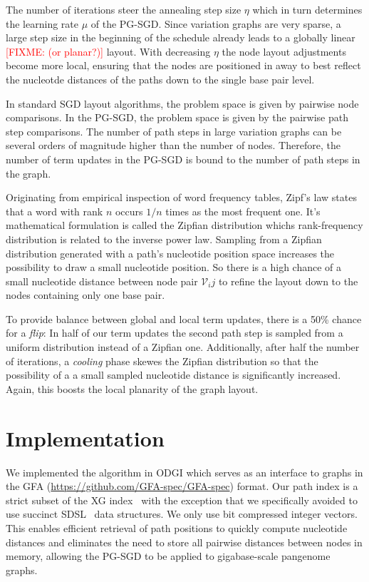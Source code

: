 \documentclass{bioinfo}
\theoremstyle{definition}
\newcommand{\red}[1]{{\textcolor{Red}{#1}}}
\newcommand{\FIXME}[1]{\red{[FIXME: #1]}}
\begin{document}
	
	
	The number of iterations steer the annealing step size $\eta$ which in turn determines the learning rate $\mu$ of the PG-SGD. 
	Since variation graphs are very sparse, a large step size in the beginning of the schedule already leads to a globally linear \FIXME{(or planar?)} layout.
	With decreasing $\eta$ the node layout adjustments become more local, ensuring that the nodes are positioned in away to best reflect the nucleotde distances of the paths down to the single base pair level. 
	
	In standard SGD layout algorithms, the problem space is given by pairwise node comparisons. In the PG-SGD, the problem space is given by the pairwise path step comparisons. The number of path steps in large variation graphs can be several orders of magnitude higher than the number of nodes. Therefore, the number of term updates in the PG-SGD is bound to the number of path steps in the graph.

	Originating from empirical inspection of word frequency tables, Zipf's law states that a word with rank $n$ occurs $1/n$ times as the most frequent one.
	It's mathematical formulation is called the Zipfian distribution whichs rank-frequency distribution is related to the inverse power law.
	Sampling from a Zipfian distribution generated with a path's nucleotide position space increases the possibility to draw a small nucleotide position.
	So there is a high chance of a small nucleotide distance between node pair $\mathcal{V}_ij$ to refine the layout down to the nodes containing only one base pair.
	
	To provide balance between global and local term updates, there is a 50\% chance for a \textit{flip}: In half of our term updates the second path step is sampled from a uniform distribution instead of a Zipfian one. Additionally, after half the number of iterations, a \textit{cooling} phase skewes the Zipfian distribution so that the possibility of a a small sampled nucleotide distance is significantly increased. Again, this boosts the local planarity of the graph layout.
	
	\section{Implementation}
	
	We implemented the algorithm in ODGI which serves as an interface to graphs in the GFA (\url{https://github.com/GFA-spec/GFA-spec}) format. 
	Our path index is a strict subset of the XG index~\citep{Garrison:2018} with the exception that
	we specifically avoided to use succinct SDSL~\citep{Gog2014} data structures. We only use bit compressed integer vectors. 
	This enables efficient retrieval of path positions to quickly compute nucleotide distances and eliminates the need to store all pairwise distances between nodes in memory, allowing the PG-SGD to be applied to gigabase-scale pangenome graphs.
\end{document}
